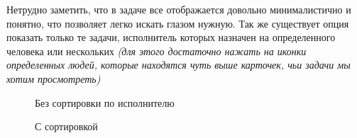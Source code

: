 \documentclass[12pt, a4paper]{article}
\begin{document}
    Нетрудно заметить, что в задаче все отображается довольно минималистично и понятно, что позволяет
    легко искать глазом нужную.
    Так же существует опция показать только те задачи, исполнитель которых назначен на определенного человека
    или нескольких \textit{(для этого достаточно нажать на иконки определенных людей, которые находятся
    чуть выше карточек, чьи задачи мы хотим просмотреть)}
    \begin{multicols}{2}[]
        \begin{figure}[H]
            \caption{Без сортировки по исполнителю}
        \end{figure}
        \columnbreak
        \begin{figure}[H]
            \caption{С сортировкой}
        \end{figure}
    \end{multicols}
\end{document}

